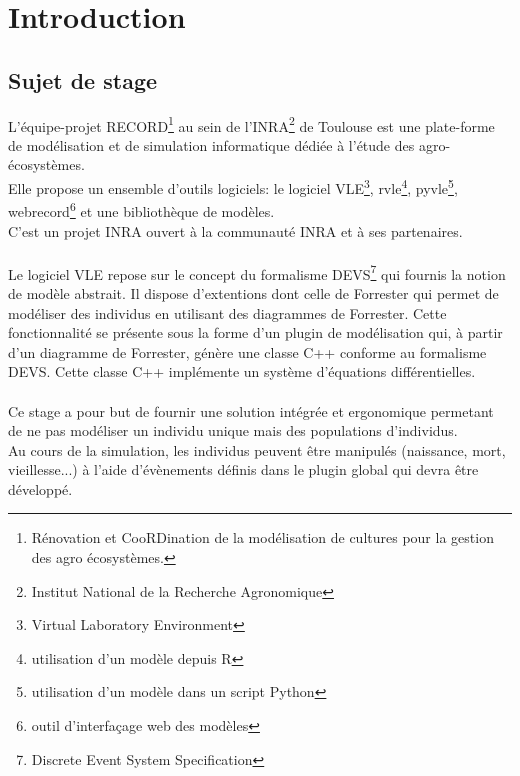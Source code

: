 \chapter{Introduction}
\setlength{\parskip}{2.5ex plus .4ex minus .4ex}
\section{Sujet de stage}
L'équipe-projet RECORD\footnote{Rénovation et CooRDination de la modélisation de cultures pour la
gestion des agro écosystèmes.} au sein de l'INRA\footnote{Institut National de la Recherche Agronomique} de Toulouse est une plate-forme de modélisation et de simulation informatique dédiée à l'étude des agro-écosystèmes.\\
Elle propose un ensemble d'outils logiciels: le logiciel VLE\footnote{Virtual Laboratory Environment}, rvle\footnote{utilisation d'un modèle depuis R}, pyvle\footnote{utilisation d'un modèle dans un script Python}, webrecord\footnote{outil d'interfaçage web des modèles} et une bibliothèque de modèles.\\
C'est un projet INRA ouvert à la communauté INRA et à ses partenaires.\\
\\
Le logiciel VLE repose sur le concept du formalisme DEVS\footnote{Discrete Event System Specification} qui fournis la notion de modèle abstrait. Il dispose d'extentions dont celle de Forrester qui permet de modéliser des individus en utilisant des diagrammes de Forrester. Cette fonctionnalité se présente sous la forme d'un plugin de modélisation qui, à partir d'un diagramme de Forrester, génère une classe C++ conforme au formalisme DEVS. Cette classe C++ implémente un système d'équations différentielles.\\
\\
Ce stage a pour but de fournir une solution intégrée et ergonomique permetant de ne pas modéliser un individu unique mais des populations d'individus.\\
Au cours de la simulation, les individus peuvent être manipulés (naissance, mort, vieillesse...) à l'aide d'évènements définis dans le plugin global qui devra être développé.

